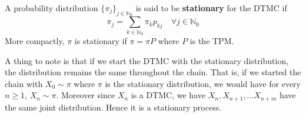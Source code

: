 \documentclass[a4paper,10pt]{article}
\begin{document}
\begin{defn}
  A probability distribution $\{\pi_j\}_{j \in \mathbb{N}_0}$ is said to
  be \textbf{stationary} for the DTMC if
\[\pi_j = \sum_{k \in \mathbb{N}_0} \pi_k p_{kj} \quad \forall j \in \mathbb{N}_0\]
More compactly, $\pi$ is stationary if $\pi = \pi P$ where $P$ is the TPM.
\end{defn}

A thing to note is that if we start the DTMC with the stationary distribution, the distribution remains the same throughout the chain. That is, if we started the chain with $X_0 \sim \pi$ where $\pi$ is the stationary distribution, we would have for every $n \geq 1$, $X_n \sim \pi$. Moreover since $X_n$ is a DTMC, we have $X_n, X_{n+1}, ... X_{n+m}$ have the same joint distribution. Hence it is a stationary process.
\end{document}
